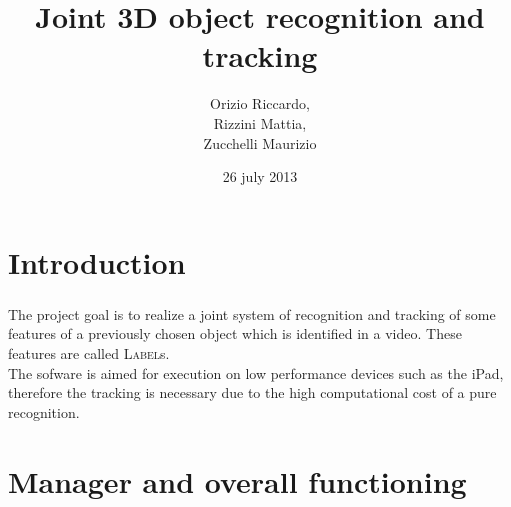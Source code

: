 \documentclass{beamer}
\title{Joint 3D object recognition and tracking}
\author[Orizio, Rizzini, Zucchelli]{Orizio Riccardo,\\Rizzini Mattia,\\Zucchelli Maurizio}
\date{26 july 2013}
\institute[UniBS]{University of Brescia}
\begin{document}
  \begin{frame}
    \maketitle
  \end{frame}

  \section{Introduction}
  
  \begin{frame}
    \frametitle{\insertsection}
    The project goal is to realize a joint system of recognition and tracking
    of some features of a previously chosen object which is identified in a
    video.  These features are called \textsc{Label}s.\\
    The sofware is aimed for execution on low performance devices such as the
    iPad, therefore the tracking is necessary due to the high computational
    cost of a pure recognition.\\
  \end{frame}


  \section{Manager and overall functioning}
\end{document}

